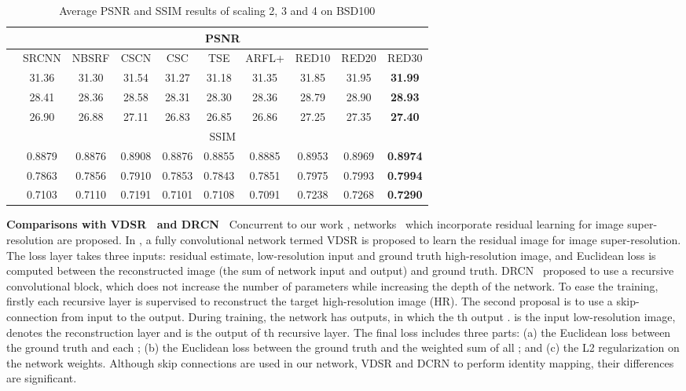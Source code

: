 \documentclass[10pt,journal,compsoc]{IEEEtran}
\begin{document}
\begin{table*}[htb!]
\centering
\caption{Average PSNR and SSIM results of scaling 2, 3 and 4 on BSD100}
\begin{tabular}{c|c c c c c c c c c}  \hline
              &\multicolumn{9}{c}{PSNR}            \\ \hline
           &SRCNN  &NBSRF  &CSCN   &CSC    &TSE    &ARFL+  &RED10  &RED20   &RED30           \\ \hline
    &31.36  &31.30  &31.54  &31.27  &31.18  &31.35  &31.85  &31.95   &\textbf{31.99}  \\ \hline
    &28.41  &28.36  &28.58  &28.31  &28.30  &28.36  &28.79  &28.90   &\textbf{28.93}  \\ \hline
    &26.90  &26.88  &27.11  &26.83  &26.85  &26.86  &27.25  &27.35   &\textbf{27.40}  \\ \hline
              &\multicolumn{9}{c}{SSIM}            \\ \hline
    &0.8879 &0.8876 &0.8908 &0.8876 &0.8855 &0.8885 &0.8953 &0.8969  &\textbf{0.8974} \\ \hline
    &0.7863 &0.7856 &0.7910 &0.7853 &0.7843 &0.7851 &0.7975 &0.7993  &\textbf{0.7994} \\ \hline
    &0.7103 &0.7110 &0.7191 &0.7101 &0.7108 &0.7091 &0.7238 &0.7268  &\textbf{0.7290} \\ \hline
\end{tabular}
\label{table7}
\end{table*}


{\bf{Comparisons with VDSR~\cite{DBLP:journals/corr/KimLL15b}
and DRCN~\cite{DBLP:journals/corr/KimLL15a}}}
Concurrent to our work \cite{NIPS2016Mao}, networks~\cite{DBLP:journals/corr/KimLL15b,DBLP:journals/corr/KimLL15a}
which incorporate residual learning for image super-resolution are proposed.
In \cite{DBLP:journals/corr/KimLL15b}, a fully convolutional network termed  VDSR
is proposed to learn the residual image for image super-resolution.
The loss layer takes three inputs: residual estimate, low-resolution input and
ground truth high-resolution image, and Euclidean loss is computed between the
reconstructed image (the sum of network input and output) and ground truth.
DRCN~\cite{DBLP:journals/corr/KimLL15a} proposed to use a recursive convolutional block,
which does not increase the number of parameters while increasing the depth of the network.
To ease the training, firstly each recursive layer is supervised to reconstruct the
target high-resolution image (HR). The second proposal is to use a skip-connection
from input to the output. During training, the network has  outputs,
in which the th output .  is the input low-resolution image,
 denotes the reconstruction layer and  is the output of th recursive layer.
The final loss includes three parts: (a) the Euclidean loss between the ground truth and each ;
(b) the Euclidean loss between the ground truth and the weighted sum of all ; and
(c) the L2 regularization on the network weights. Although skip connections are used in our network,
VDSR and DCRN to perform identity mapping, their differences are significant.
\end{document}
